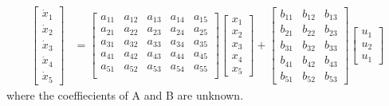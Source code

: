 \begin{align*}
\begin{bmatrix}
    \dot x_1 \\
    \dot x_2\\
    \dot x_3\\
    \dot x_4\\
    \dot x_5
\end{bmatrix}&=
\begin{bmatrix}
  a_{11} &  a_{12}&  a_{13}&  a_{14}&  a_{15} \\
  a_{21} &  a_{22}&  a_{23}&  a_{24}&  a_{25} \\  
  a_{31} &  a_{32}&  a_{33}&  a_{34}&  a_{35} \\  
  a_{41} &  a_{42}&  a_{43}&  a_{44}&  a_{45} \\  
  a_{51} &  a_{52}&  a_{53}&  a_{54}&  a_{55} \\  
\end{bmatrix} 
\begin{bmatrix}
     x_1 \\
     x_2\\
     x_3\\
     x_4\\
     x_5
\end{bmatrix}
+
\begin{bmatrix}
    b_{11} & b_{12} & b_{13}\\
    b_{21} & b_{22} & b_{23}\\
    b_{31} & b_{32} & b_{33}\\
    b_{41} & b_{42} & b_{43}\\
    b_{51} & b_{52} & b_{53}   
\end{bmatrix}
\begin{bmatrix}
    u_1 \\
    u_2 \\
    u_1 
\end{bmatrix}
\end{align*}
%
where the coeffiecients of A and B are unknown.




